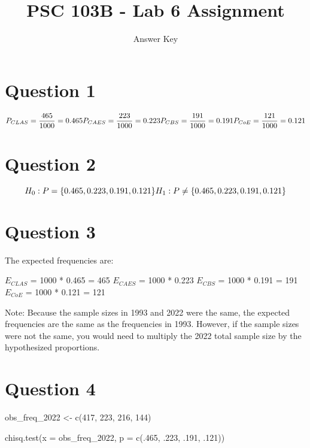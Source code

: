 \documentclass[
  letterpaper,
  DIV=11,
  numbers=noendperiod]{scrartcl}
\title{PSC 103B - Lab 6 Assignment}
\subtitle{Answer Key}
\author{}
\date{}
\newenvironment{Shaded}{\begin{snugshade}}{\end{snugshade}}
\newcommand{\AttributeTok}[1]{\textcolor[rgb]{0.40,0.45,0.13}{#1}}
\newcommand{\DecValTok}[1]{\textcolor[rgb]{0.68,0.00,0.00}{#1}}
\newcommand{\FunctionTok}[1]{\textcolor[rgb]{0.28,0.35,0.67}{#1}}
\newcommand{\NormalTok}[1]{\textcolor[rgb]{0.00,0.23,0.31}{#1}}
\newcommand{\OtherTok}[1]{\textcolor[rgb]{0.00,0.23,0.31}{#1}}
\begin{document}
\maketitle

\section{Question 1}\label{question-1}

\[
P_{CLAS} = \frac{465}{1000} = 0.465\\
P_{CAES} = \frac{223}{1000} = 0.223\\
P_{CBS} = \frac{191}{1000} = 0.191\\
P_{CoE} = \frac{121}{1000} = 0.121\\
\]

\section{Question 2}\label{question-2}

\[
H_0: P = \{0.465,0.223,0.191,0.121\}\\
H_1: P \neq \{0.465,0.223,0.191,0.121\}
\]

\section{Question 3}\label{question-3}

The expected frequencies are:

\(E_{CLAS}\) = 1000 * 0.465 = 465 \(E_{CAES}\) = 1000 * 0.223
\(E_{CBS}\) = 1000 * 0.191 = 191 \(E_{CoE}\) = 1000 * 0.121 = 121

Note: Because the sample sizes in 1993 and 2022 were the same, the
expected frequencies are the same as the frequencies in 1993. However,
if the sample sizes were not the same, you would need to multiply the
2022 total sample size by the hypothesized proportions.

\section{Question 4}\label{question-4}

\begin{Shaded}
\begin{Highlighting}[]
\NormalTok{obs\_freq\_2022 }\OtherTok{\textless{}{-}} \FunctionTok{c}\NormalTok{(}\DecValTok{417}\NormalTok{, }\DecValTok{223}\NormalTok{, }\DecValTok{216}\NormalTok{, }\DecValTok{144}\NormalTok{)}

\FunctionTok{chisq.test}\NormalTok{(}\AttributeTok{x =}\NormalTok{ obs\_freq\_2022, }\AttributeTok{p =} \FunctionTok{c}\NormalTok{(.}\DecValTok{465}\NormalTok{, .}\DecValTok{223}\NormalTok{, .}\DecValTok{191}\NormalTok{, .}\DecValTok{121}\NormalTok{))}
\end{Highlighting}
\end{Shaded}
\end{document}

